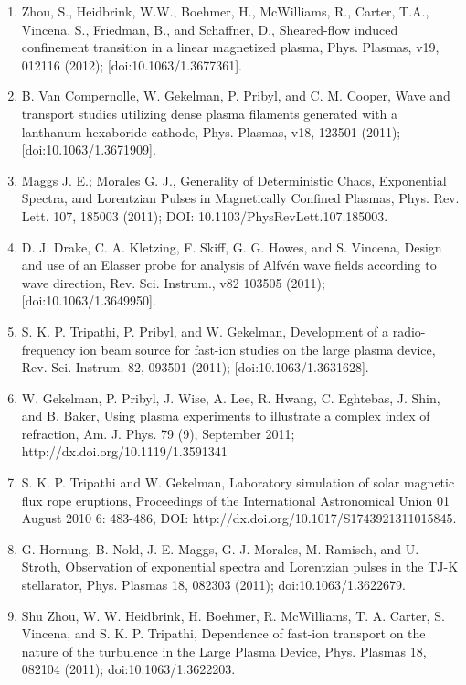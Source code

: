 \documentclass[11pt]{article}
\begin{document}
\begin{enumerate}
\item   Zhou, S., Heidbrink, W.W., Boehmer, H., McWilliams, R., Carter, T.A., Vincena, S., Friedman, B., and Schaffner, D., Sheared-flow induced confinement transition in a linear magnetized plasma, Phys. Plasmas, v19, 012116 (2012); [doi:10.1063/1.3677361].

\item   B. Van Compernolle, W. Gekelman, P. Pribyl, and C. M. Cooper, Wave and transport studies utilizing dense plasma filaments generated with a lanthanum hexaboride cathode, Phys. Plasmas, v18, 123501 (2011); [doi:10.1063/1.3671909].

\item  Maggs J. E.; Morales G. J., Generality of Deterministic Chaos, Exponential Spectra, and Lorentzian Pulses in Magnetically Confined Plasmas, Phys. Rev. Lett. 107, 185003 (2011); DOI: 10.1103/PhysRevLett.107.185003.

\item  D. J. Drake, C. A. Kletzing, F. Skiff, G. G. Howes, and S. Vincena, Design and use of an Elasser probe for analysis of Alfv\'{e}n wave fields according to wave direction, Rev. Sci. Instrum., v82 103505 (2011); [doi:10.1063/1.3649950].

\item   S. K. P. Tripathi, P. Pribyl, and W. Gekelman, Development of a radio-frequency ion beam source for fast-ion studies on the large plasma device, Rev. Sci. Instrum. 82, 093501 (2011); [doi:10.1063/1.3631628].

\item   W. Gekelman, P. Pribyl, J. Wise, A. Lee, R. Hwang, C. Eghtebas, J. Shin, and B. Baker, Using plasma experiments to illustrate a complex index of refraction, Am. J. Phys. 79 (9), September 2011; http://dx.doi.org/10.1119/1.3591341

\item   S. K. P. Tripathi and W. Gekelman, Laboratory simulation of solar magnetic flux rope eruptions, Proceedings of the International Astronomical Union 01 August 2010 6: 483-486, DOI: http://dx.doi.org/10.1017/S1743921311015845.

\item   G. Hornung, B. Nold, J. E. Maggs, G. J. Morales, M. Ramisch, and U. Stroth, Observation of exponential spectra and Lorentzian pulses in the TJ-K stellarator, Phys. Plasmas 18, 082303 (2011); doi:10.1063/1.3622679.

\item  Shu Zhou, W. W. Heidbrink, H. Boehmer, R. McWilliams, T. A. Carter, S. Vincena, and S. K. P. Tripathi, Dependence of fast-ion transport on the nature of the turbulence in the Large Plasma Device, Phys. Plasmas 18, 082104 (2011); doi:10.1063/1.3622203.


\end{enumerate}
\end{document}
